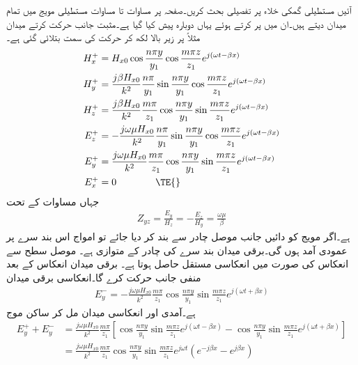 آئیں مستطیلی گمکی خلاء پر تفصیلی بحث کریں۔صفحہ  پر مساوات  تا مساوات  مستطیلی مویج میں تمام  میدان دیتے ہیں۔ان میں  پر کرتے ہوئے یہاں دوبارہ پیش کیا گیا ہے۔مثبت  جانب حرکت کرتے میدان مثلاً  پر زیر بالا  لکھ کر حرکت کی سمت بتلائی گئی ہے۔
 \begin{align}
H_x^{+}&=H_{x0} \cos \frac{n \pi y}{y_1}  \cos  \frac{m \pi z}{z_1} e^{j (\omega t -\beta x)}\\
H_y^{+}&=\frac{j \beta H_{x0}}{k^2}\frac{n \pi}{y_1} \sin \frac{n\pi y}{y_1} \cos \frac{m \pi z}{z_1} e^{j (\omega t -\beta x)} \\
H_z^{+}&=\frac{j \beta H_{x0}}{k^2}\frac{m \pi}{z_1} \cos \frac{n\pi y}{y_1} \sin \frac{m \pi z}{z_1} e^{j (\omega t -\beta x)}\\
E_z^{+}&=-\frac{j \omega \mu H_{x0}}{k^2}\frac{n \pi}{y_1} \sin \frac{n\pi y}{y_1} \cos \frac{m \pi z}{z_1} e^{j (\omega t -\beta x)}\\
E_y^{+}&=\frac{j \omega \mu H_{x0}}{k^2}\frac{m \pi}{z_1}\cos \frac{n\pi y}{y_1} \sin \frac{m \pi z}{z_1} e^{j (\omega t -\beta x)}\\
E_x^{+}&=0 \quad \quad \quad \quad \TE{}
\end{align}
جہاں مساوات  کے تحت
\begin{align}
Z_{yz}=\frac{E_y}{H_z}=-\frac{E_z}{H_y}=\frac{\omega \mu}{\beta}
\end{align}
ہے۔اگر مویج کو دائیں جانب موصل چادر سے بند کر دیا جائے تو امواج اس بند سرے پر عمودی آمد ہوں گی۔برقی میدان  بند سرے کی چادر کے متوازی ہے۔ موصل سطح سے انعکاس کی صورت میں انعکاسی مستقل  حاصل ہوتا ہے۔ برقی میدان انعکاس کے بعد منفی  جانب حرکت کرے گا۔انعکاسی برقی میدان
\begin{align}
E_y^{-}=-\frac{j \omega \mu H_{x0}}{k^2}\frac{m \pi}{z_1}\cos \frac{n\pi y}{y_1} \sin \frac{m \pi z}{z_1} e^{j (\omega t +\beta x)}
\end{align} 
ہے۔آمدی اور انعکاسی میدان مل کر ساکن موج
\begin{align*}
E_y^{+}+E_y^{-}&=\frac{j \omega \mu  H_{x0}}{k^2}\frac{m \pi}{z_1}\left[\cos \frac{n\pi y}{y_1} \sin \frac{m \pi z}{z_1} e^{j (\omega t -\beta x)}-\cos \frac{n\pi y}{y_1} \sin \frac{m \pi z}{z_1} e^{j (\omega t +\beta x)}\right]\\
&=\frac{j \omega \mu H_{x0}}{k^2}\frac{m \pi}{z_1}\cos \frac{n\pi y}{y_1} \sin \frac{m \pi z}{z_1}e^{j\omega t} \left(e^{-j\beta  x} - e^{j \beta x}\right)
\end{align*}
